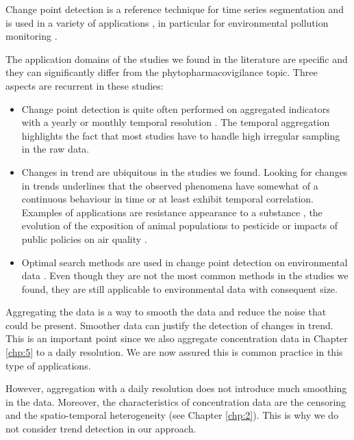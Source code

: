 Change point detection is a reference technique for time series segmentation and is used in a variety of applications \citep{basseville1993detection, chen2012parametric, liu2017change, reeves2007review, levy2009detection}, in particular for environmental pollution monitoring \citep{costa2016}. 


The application domains of the studies we found in the literature are specific  and they can significantly differ from the phytopharmacovigilance topic. Three aspects are recurrent in these studies: 
\begin{itemize}
\item Change point detection is quite often performed on aggregated indicators with a yearly or monthly temporal resolution \citep{Ko2017,Ryberg2020,FOMBY2006}. The temporal aggregation highlights the fact that most studies have to handle high irregular sampling in the raw data. 
\item Changes in trend are ubiquitous in the studies we found. Looking for changes in trends underlines that the observed phenomena have somewhat of a continuous behaviour in time or at least exhibit temporal correlation. Examples of applications are resistance appearance to a substance \citep{Solla2010}, the evolution of the exposition of animal populations to pesticide \citep{Menger2022} or impacts of public policies on air quality \citep{FOMBY2006}.
\item Optimal search methods are used in change point detection on environmental data \citep{BUNCE_2018,Ryberg2020}. Even though they are not the most common methods in the studies we found, they are still applicable to environmental data with consequent size. 
\end{itemize}

Aggregating the data is a way to smooth the data and reduce the noise that could be present. Smoother data can justify the detection of changes in trend. This is an important point since we also aggregate concentration data in Chapter \ref{chp:5} to a daily resolution. We are now assured this is common practice in this type of applications. 

However, aggregation with a daily resolution does not introduce much smoothing in the data. Moreover, the characteristics of concentration data are the censoring and the spatio-temporal heterogeneity (see Chapter \ref{chp:2}). This is why we do not consider trend detection in our approach.

